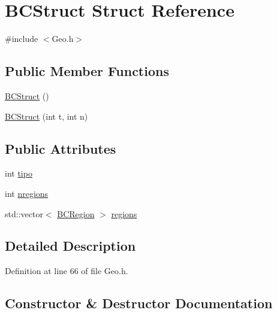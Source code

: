 \hypertarget{structBCStruct}{}\section{B\+C\+Struct Struct Reference}
\label{structBCStruct}


{\ttfamily \#include $<$Geo.\+h$>$}

\subsection*{Public Member Functions}
\begin{DoxyCompactItemize}
\item 
\hyperlink{structBCStruct_ad8aeae3019a81df6c393775a40ae5820}{B\+C\+Struct} ()
\item 
\hyperlink{structBCStruct_a386d4109f10a0afcfde6a2eb5cc042f2}{B\+C\+Struct} (int t, int n)
\end{DoxyCompactItemize}
\subsection*{Public Attributes}
\begin{DoxyCompactItemize}
\item 
int \hyperlink{structBCStruct_a501cb7bb8dc241cc7fe6f24ce23b4269}{tipo}
\item 
int \hyperlink{structBCStruct_a0e4797d0448c5eb3a02ffd8c10661c36}{nregions}
\item 
std\+::vector$<$ \hyperlink{structBCRegion}{B\+C\+Region} $>$ \hyperlink{structBCStruct_a36709c2ded1119ce84dad8aa5f64d877}{regions}
\end{DoxyCompactItemize}


\subsection{Detailed Description}


Definition at line 66 of file Geo.\+h.



\subsection{Constructor \& Destructor Documentation}
\mbox{\label{structBCStruct_ad8aeae3019a81df6c393775a40ae5820}} 
